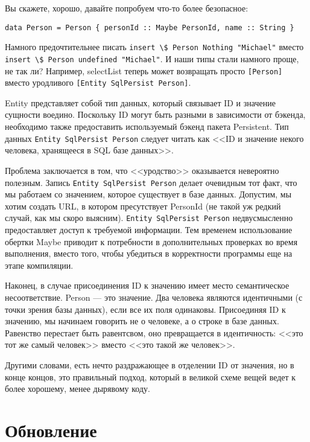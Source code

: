 Вы скажете, хорошо, давайте попробуем что-то более безопасное:

\begin{lstlisting}
data Person = Person { personId :: Maybe PersonId, name :: String }
\end{lstlisting}

Намного предочтительнее писать \lstinline'insert \$ Person Nothing "Michael"' вместо \lstinline'insert \$ Person undefined "Michael"'. И наши типы стали намного проще, не так ли? Например, selectList теперь может возвращать просто \lstinline'[Person]' вместо уродливого \lstinline'[Entity SqlPersist Person]'.

\begin{remark}
Entity представляет собой тип данных, который связывает ID и значение сущности воедино. Поскольку ID могут быть разными в зависимости от бэкенда, необходимо также предоставить используемый бэкенд пакета Persistent. Тип данных \lstinline'Entity SqlPersist Person' следует читать как <<ID и значение некого человека, хранящееся в SQL базе данных>>.
\end{remark}

Проблема заключается в том, что <<уродство>> оказывается невероятно полезным. Запись \lstinline'Entity SqlPersist Person' делает очевидным тот факт, что мы работаем со значением, которое существует в базе данных. Допустим, мы хотим создать URL, в котором пресутствует PersonId (не такой уж редкий случай, как мы скоро выясним). \lstinline'Entity SqlPersist Person' недвусмысленно предоставляет доступ к требуемой информации. Тем временем использование обертки Maybe приводит к потребности в дополнительных проверках во время выполнения, вместо того, чтобы убедиться в корректности программы еще на этапе компиляции.

Наконец, в случае присоединения ID к значению имеет место семантическое несоответствие. Person --- это значение. Два человека являются идентичными (с точки зрения базы данных), если все их поля одинаковы. Присоединяя ID к значению, мы начинаем говорить не о человеке, а о строке в базе данных. Равенство перестает быть равентсвом, оно превращается в идентичность: <<это тот же самый человек>> вместо <<это такой же человек>>.

Другими словами, есть нечто раздражающее в отделении ID от значения, но в конце концов, это правильный подход, который в великой схеме вещей ведет к более хорошему, менее дырявому коду.

\section{Обновление} %

